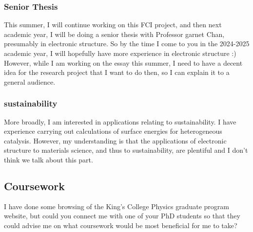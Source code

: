 \documentclass[12pt]{article}
\begin{document}
\subsubsection{Senior Thesis}
This summer, I will continue working on this FCI project, and then next academic year, I will be doing a senior thesis with Professor garnet Chan, presumably in electronic structure. So by the time I come to you in the 2024-2025 academic year, I will hopefully have more experience in electronic structure :) However, while I am working on the essay this summer, I need to have a decent idea for the research project that I want to do then, so I can explain it to a general audience.
\subsubsection{sustainability}
More broadly, I am interested in applications relating to sustainability. I have experience carrying out calculations of surface energies for heterogeneous catalysis. However, my understanding is that the applications of electronic structure to materials science, and thus to sustainability, are plentiful and I don't think we talk about this part.
\subsection{Coursework}
I have done some browsing of the King's College Physics graduate program website, but could you connect me with one of your PhD students so that they could advise me on what coursework would be most beneficial for me to take? 
\end{document}
